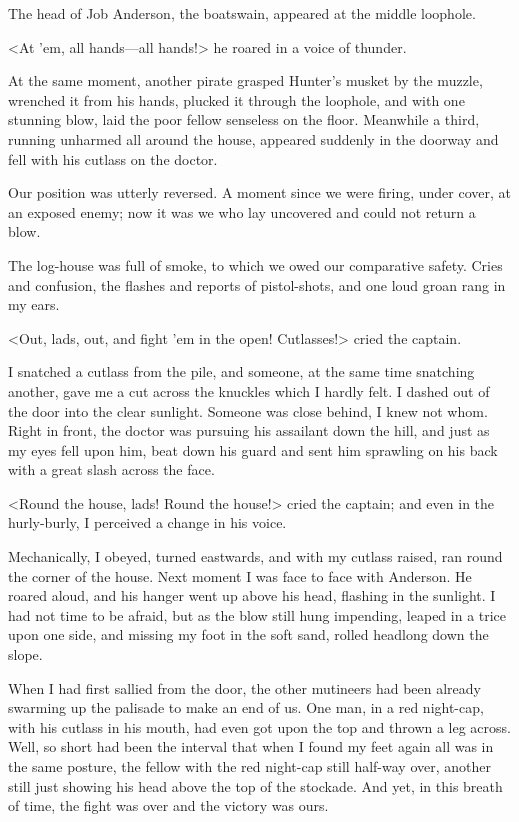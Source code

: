 The head of Job Anderson, the boatswain, appeared at the middle loophole.

<At 'em, all hands—all hands!> he roared in a voice of thunder.

At the same moment, another pirate grasped Hunter's musket by the muzzle, wrenched it from his hands, plucked it through the loophole, and with one stunning blow, laid the poor fellow senseless on the floor. Meanwhile a third, running unharmed all around the house, appeared suddenly in the doorway and fell with his cutlass on the doctor.

Our position was utterly reversed. A moment since we were firing, under cover, at an exposed enemy; now it was we who lay uncovered and could not return a blow.

The log-house was full of smoke, to which we owed our comparative safety. Cries and confusion, the flashes and reports of pistol-shots, and one loud groan rang in my ears.

<Out, lads, out, and fight 'em in the open! Cutlasses!> cried the captain.

I snatched a cutlass from the pile, and someone, at the same time snatching another, gave me a cut across the knuckles which I hardly felt. I dashed out of the door into the clear sunlight. Someone was close behind, I knew not whom. Right in front, the doctor was pursuing his assailant down the hill, and just as my eyes fell upon him, beat down his guard and sent him sprawling on his back with a great slash across the face.

<Round the house, lads! Round the house!> cried the captain; and even in the hurly-burly, I perceived a change in his voice.

Mechanically, I obeyed, turned eastwards, and with my cutlass raised, ran round the corner of the house. Next moment I was face to face with Anderson. He roared aloud, and his hanger went up above his head, flashing in the sunlight. I had not time to be afraid, but as the blow still hung impending, leaped in a trice upon one side, and missing my foot in the soft sand, rolled headlong down the slope.

When I had first sallied from the door, the other mutineers had been already swarming up the palisade to make an end of us. One man, in a red night-cap, with his cutlass in his mouth, had even got upon the top and thrown a leg across. Well, so short had been the interval that when I found my feet again all was in the same posture, the fellow with the red night-cap still half-way over, another still just showing his head above the top of the stockade. And yet, in this breath of time, the fight was over and the victory was ours.

